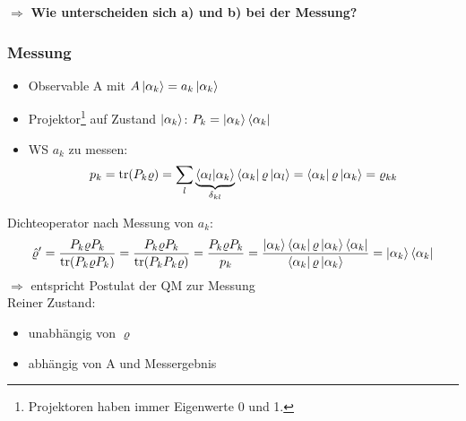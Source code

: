 $\Longrightarrow$ \textbf{Wie unterscheiden sich a) und b) bei der Messung?}

\subsubsection{Messung}
\begin{itemize}
    \item[] Observable A mit $A \ket{\alpha_k} = a_k \ket{\alpha_k}$
    \item[] Projektor\footnote{Projektoren haben immer Eigenwerte 0 und 1.} auf Zustand $\ket{\alpha_k}$: $P_k = \ket{\alpha_k}\bra{\alpha_k}$
    \item[] WS $a_k$ zu messen:
    \begin{equation*}
        p_k = \trace(P_k \varrho) = \sum_l \underbrace{\bra{\alpha_l}\ket{\alpha_k}}_{\delta_{kl}} \bra{\alpha_k} \varrho \ket{\alpha_l} = \bra{\alpha_k} \varrho \ket{\alpha_k} = \varrho_{kk}
    \end{equation*}
\end{itemize}

Dichteoperator nach Messung von $a_k$:
\begin{equation}
    \hat{\varrho}' = \frac{P_k \varrho P_k}{\trace(P_k \varrho P_k)} = \frac{P_k \varrho P_k}{\trace(P_k P_k \varrho)} = \frac{P_k \varrho P_k}{p_k} = \frac{\ket{\alpha_k} \bra{\alpha_k} \varrho \ket{\alpha_k} \bra{\alpha_k}}{\bra{\alpha_k} \varrho \ket{\alpha_k}} = \ket{\alpha_k} \bra{\alpha_k}
\end{equation}
$\Longrightarrow$ entspricht Postulat der QM zur Messung\\

Reiner Zustand: 
\begin{itemize}
    \item unabhängig von $\varrho$
    \item abhängig von A und Messergebnis
\end{itemize}

